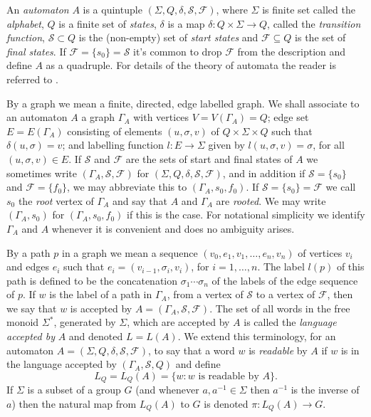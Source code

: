 \documentclass[a4paper,12pt]{article}
\newcommand{\G}{\Gamma }
\renewcommand{\d}{\delta }
\newcommand{\s}{\sigma }
\renewcommand{\S}{\Sigma }
\newcommand{\cF}{{\cal{F}}}
\newcommand{\cS}{{\cal{S}}}
\numberwithin{equation}{section}
\numberwithin{figure}{section}
\renewcommand{\cF}{\mathcal{F}}
\renewcommand{\cS}{\mathcal{S}}
\newcommand{\maps}{\rightarrow}
\begin{document}
An {\em automaton} $A$ is  a quintuple
$(\S,Q,\d,\mathcal{S},\mathcal{F})$, where $\S$ is finite set
called the {\em alphabet}, $Q$ is a finite set of {\em states},
$\d$ is a map $\d:Q\times \S\maps Q$, called the {\em transition
function}, $\mathcal{S}\subset Q$ is the (non-empty) set of {\em
start states} and $\mathcal{F}\subseteq Q$ is the set of {\em
final states}.  If
$\mathcal{F}=\{s_0\}=\mathcal{S}$ it's common to drop
$\mathcal{F}$ from the description and define $A$ as a quadruple.
For details of the theory of automata the reader is referred to
 \cite{Lawson04}.

By a graph we mean a finite, directed, edge labelled graph.
We shall associate to an automaton $A$
a graph $\G_A$ with vertices
$V=V(\G_A)=Q$; edge set $E=E(\G_A)$ consisting of elements
$(u,\s,v)$ of $Q\times \S\times Q$ such that $\d(u,\s)=v$; and
labelling function $l:E\maps \S$ given by $l(u,\s,v)=\s$, for all
$(u,\s,v) \in E$.  If $\mathcal{S}$ and $\mathcal{F}$ are the sets
of start and final states of $A$ we sometimes write
$(\G_A,\mathcal{S},\mathcal{F})$ for
$(\S,Q,\d,\mathcal{S},\mathcal{F})$, and in addition if
$\mathcal{S}=\{s_0\}$ and $\mathcal{F}=\{f_0\}$, we may abbreviate
this to $(\G_A,s_0,f_0)$. If $\mathcal{S}=\{s_0\}=\mathcal{F}$
we
call $s_0$ the {\em root}
vertex of $\G_A$ and say that $A$ and $\G_A$ are {\em rooted}. We may
 write $(\G_A,s_0)$ for $(\G_A,s_0,f_0)$ if this is the case.  For notational simplicity we identify $\G_A$
and $A$ whenever it is convenient and does no ambiguity arises.

By a path $p$
in a graph we mean a sequence $(v_0,e_1,v_1, \ldots , e_n ,v_n)$ of
 vertices $v_i$ and edges $e_i$ such that
 $e_i=(v_{i-1},\s_i,v_i)$, for $i=1,\ldots ,n$.
The
label $l(p)$ of this  path is defined to be
 the concatenation $\s_1\cdots \s_n$ of the labels of the
edge sequence of $p$.  If $w$ is the label of a path
in $\G_A$, from a vertex of $\cS$ to a vertex of $\cF$, then we
say that $w$ is accepted by $A=(\G_A,\cS,\cF)$. The set of all
words in the free monoid $\S^*$, generated by $\S$, which are
accepted by $A$  is called
the {\em language accepted by} $A$ and denoted $L=L(A)$.
We extend this terminology, for an automaton
$A=(\S,Q,\d,\mathcal{S},\mathcal{F})$,
to say that a  word $w$ is {\em readable}
by $A$ if $w$ is in the
language accepted by $(\G_A,\cS,Q)$  and define
\[L_Q=L_Q(A)=\{w:w \textrm{ is readable by } A\}.\]
If $\S$ is a
subset of a group $G$ (and whenever $a,a^{-1}\in \S$ then $a^{-1}$ is
the inverse of $a$)
 then the  natural map from $L_Q(A)$ to
$G$ is denoted $\pi:L_Q(A)\maps G$.
\end{document}

